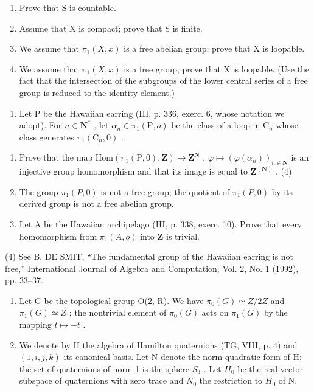 \begin{enumerate}
\def\labelenumi{\alph{enumi})}
\item
  Prove that S is countable.
\item
  Assume that X is compact; prove that S is finite.
\item
  We assume that \(\pi_{1}(X,x)\) is a free abelian group; prove that X is loopable.
\item
  We assume that \(\pi_{1}(X,x)\) is a free group; prove that X is loopable. (Use the fact that the intersection of the subgroups of the lower central series of a free group is reduced to the identity element.)
\end{enumerate}

\begin{enumerate}
\def\labelenumi{\arabic{enumi})}
\setcounter{enumi}{4}
\tightlist
\item
  Let P be the Hawaiian earring (III, p. 336, exerc. 6, whose notation we adopt). For \(n \in \mathbf{N}^*\) , let \(\alpha_n \in \pi_1(\mathrm{P}, o)\) be the class of a loop in \(\mathrm{C}_n\) whose class generates \(\pi_1(\mathrm{C}_n, 0)\) .
\end{enumerate}

\begin{enumerate}
\def\labelenumi{\alph{enumi})}
\item
  Prove that the map \(\mathrm{Hom}(\pi_{1}(\mathrm{P},0),\mathbf{Z})\to\mathbf{Z}^{\mathbf{N}}\) , \(\varphi\mapsto(\varphi(\alpha_{n}))_{n\in\mathbf{N}}\) is an injective group homomorphism and that its image is equal to \(\mathbf{Z}^{(\mathbf{N})}\) . (4)
\item
  The group \(\pi_{1}(P,0)\) is not a free group; the quotient of \(\pi_{1}(P,0)\) by its derived group is not a free abelian group.
\item
  Let A be the Hawaiian archipelago (III, p. 338, exerc. 10). Prove that every homomorphism from \(\pi_1(A, o)\) into \(\mathbf{Z}\) is trivial.
\end{enumerate}

(4) See B. DE SMIT, “The fundamental group of the Hawaiian earring is not free,” International Journal of Algebra and Computation, Vol. 2, No. 1 (1992), pp. 33–37.

\exercisegroup

\begin{enumerate}
\def\labelenumi{\arabic{enumi})}
\item
  Let G be the topological group O(2, R). We have \(\pi_{0}(G) \simeq Z/2Z\) and \(\pi_{1}(G) \simeq Z\) ; the nontrivial element of \(\pi_{0}(G)\) acts on \(\pi_{1}(G)\) by the mapping \(t \mapsto -t\) .
\item
  We denote by H the algebra of Hamilton quaternions (TG, VIII, p. 4) and \((1, i, j, k)\) its canonical basis. Let N denote the norm quadratic form of H; the set of quaternions of norm 1 is the sphere \(S_{3}\) . Let \(H_{0}\) be the real vector subspace of quaternions with zero trace and \(N_{0}\) the restriction to \(H_{0}\) of N.
\end{enumerate}

